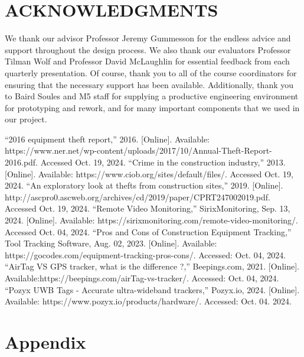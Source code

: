 \documentclass[conference]{IEEEtran}
\begin{document}
\section*{ACKNOWLEDGMENTS}
We thank our advisor Professor Jeremy Gummesson for the endless 
advice and support throughout the design process. We also thank 
our evaluators Professor Tilman Wolf and Professor David McLaughlin 
for essential feedback from each quarterly presentation. Of course, 
thank you to all of the course coordinators for ensuring that the 
necessary support has been available. Additionally, thank you to 
Baird Soules and M5 staff for supplying a productive engineering 
environment for prototyping and rework, and for many important 
components that we used in our project.


\begin{thebibliography}{00}
 ``2016 equipment theft report,'' 2016. [Online]. Available: https://www.ner.net/wp-content/uploads/2017/10/Annual-Theft-Report-2016.pdf. Accessed Oct. 19, 2024.
 ``Crime in the construction industry,'' 2013. [Online]. Available: https://www.ciob.org/sites/default/files/. Accessed Oct. 19, 2024.
 ``An exploratory look at thefts from construction sites,'' 2019. [Online]. http://ascpro0.ascweb.org/archives/cd/2019/paper/CPRT247002019.pdf. Accessed Oct. 19, 2024.
 ``Remote Video Monitoring,'' SirixMonitoring, Sep. 13, 2024. [Online]. Available: https://sirixmonitoring.com/remote-video-monitoring/. Accessed Oct. 04, 2024.
 ``Pros and Cons of Construction Equipment Tracking,'' Tool Tracking Software, Aug. 02, 2023. [Online]. Available:  https://gocodes.com/equipment-tracking-pros-cons/. Accessed: Oct. 04, 2024.
 ``AirTag VS GPS tracker, what is the difference ?,'' Beepings.com, 2021. [Online]. Available:https://beepings.com/airTag-vs-tracker/. Accessed: Oct. 04, 2024.
 ``Pozyx UWB Tags - Accurate ultra-wideband trackers,'' Pozyx.io, 2024. [Online]. Available: https://www.pozyx.io/products/hardware/. Accessed: Oct. 04. 2024.
\end{thebibliography}
\vspace{12pt}

\section*{Appendix}
\setcounter{subsection}{0}
\end{document}
